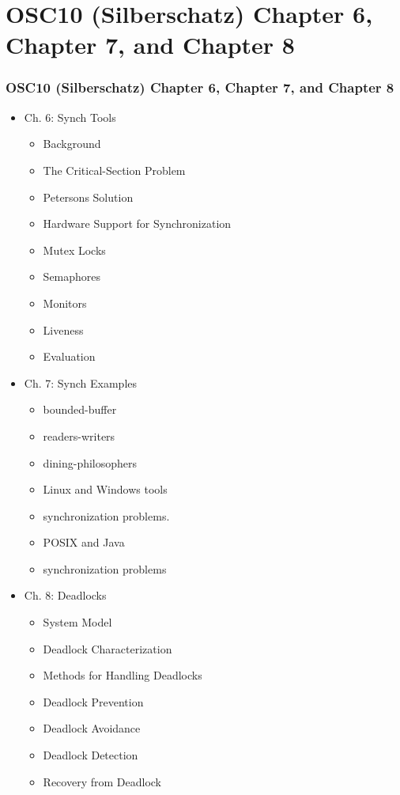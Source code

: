 \documentclass[aspectratio=169, xcolor=table, notheorems, hyperref={pdfpagelabels=false}]{beamer}
\begin{document}
\section{OSC10 (Silberschatz) Chapter 6, Chapter 7, and Chapter 8}
\begin{frame}[fragile]
\frametitle{OSC10 (Silberschatz) Chapter 6, Chapter 7, and Chapter 8}
\begin{multicols}{3}
  \begin{itemize}
  \item Ch. 6: Synch Tools
  \begin{itemize}
  \item Background
  \item The Critical-Section Problem
  \item Petersons Solution
  \item Hardware Support for Synchronization
  \item Mutex Locks
  \item Semaphores
  \item Monitors
  \item Liveness
  \item Evaluation
  \end{itemize}
  \end{itemize}
  \vfill \null
\columnbreak
  \begin{itemize}
  \item Ch. 7: Synch Examples
  \begin{itemize}
  \item bounded-buffer
  \item readers-writers
  \item dining-philosophers
  \item Linux and Windows tools
  \item synchronization problems.
  \item POSIX and Java
  \item synchronization problems
  \end{itemize}
  \end{itemize}
  \vfill \null
\columnbreak
  \begin{itemize}
  \item Ch. 8: Deadlocks
  \begin{itemize}
  \item System Model
  \item Deadlock Characterization
  \item Methods for Handling Deadlocks
  \item Deadlock Prevention
  \item Deadlock Avoidance
  \item Deadlock Detection
  \item Recovery from Deadlock
  \end{itemize}
  \end{itemize}
  \vfill \null
\end{multicols}
\end{frame}
\end{document}

